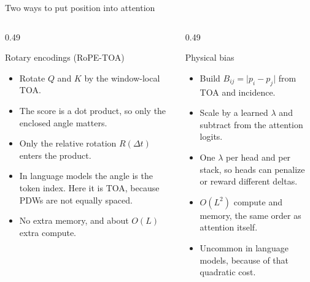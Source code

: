 \documentclass[aspectratio=169,10pt]{beamer}
\begin{document}
\begin{frame}{Two ways to put position into attention}
  \begin{columns}[T,onlytextwidth]
    \begin{column}{0.49\textwidth}
      \begin{block}{Rotary encodings (RoPE-TOA)}
        \begin{itemize}
          \item Rotate \(Q\) and \(K\) by the window-local TOA.
          \item The score is a dot product, so only the enclosed angle matters.
          \item Only the relative rotation \(R(\Delta t)\) enters the product.
          \item In language models the angle is the token index. Here it is TOA, because PDWs are not equally spaced.
          \item No extra memory, and about \(O(L)\) extra compute.
        \end{itemize}
      \end{block}
    \end{column}
    \begin{column}{0.49\textwidth}
      \begin{alertblock}{Physical bias}
        \begin{itemize}
          \item Build \(B_{ij} = \lvert p_i - p_j \rvert\) from TOA and incidence.
          \item Scale by a learned \(\lambda\) and subtract from the attention logits.
          \item One \(\lambda\) per head and per stack, so heads can penalize or reward different deltas.
          \item \(O(L^{2})\) compute and memory, the same order as attention itself.
          \item Uncommon in language models, because of that quadratic cost.
        \end{itemize}
      \end{alertblock}
    \end{column}
  \end{columns}
\end{frame}
\end{document}
